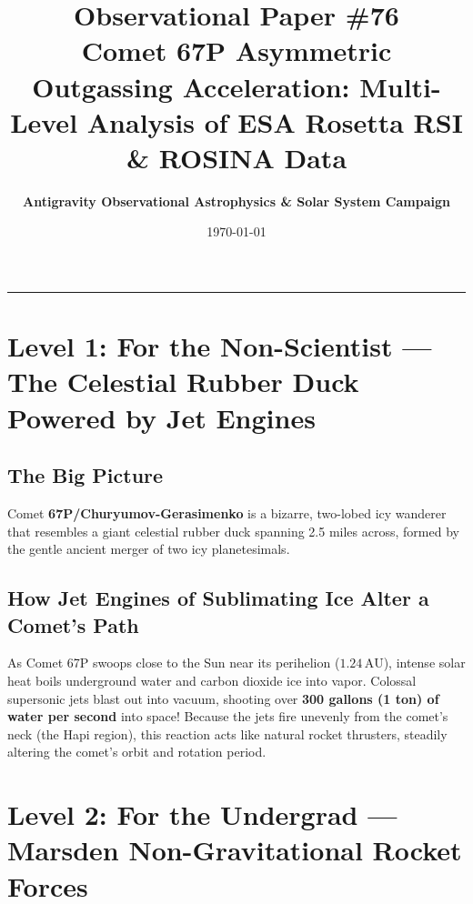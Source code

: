 \documentclass[11pt,a4paper]{article}
\title{\Huge \textbf{Observational Paper \#76}\\ \Large Comet 67P Asymmetric Outgassing Acceleration: Multi-Level Analysis of ESA Rosetta RSI \& ROSINA Data}
\author{\textbf{Antigravity Observational Astrophysics \& Solar System Campaign}}
\date{\today}
\begin{document}
\maketitle

\vspace{-1em}
\begin{center}
\rule{\textwidth}{1.5pt}
\end{center}

\section*{Level 1: For the Non-Scientist — The Celestial Rubber Duck Powered by Jet Engines}

\subsection*{The Big Picture}
Comet \textbf{67P/Churyumov-Gerasimenko} is a bizarre, two-lobed icy wanderer that resembles a giant celestial rubber duck spanning 2.5 miles across, formed by the gentle ancient merger of two icy planetesimals.

\subsection*{How Jet Engines of Sublimating Ice Alter a Comet's Path}
As Comet 67P swoops close to the Sun near its perihelion ($1.24\,\text{AU}$), intense solar heat boils underground water and carbon dioxide ice into vapor. Colossal supersonic jets blast out into vacuum, shooting over \textbf{300 gallons (1 ton) of water per second} into space! Because the jets fire unevenly from the comet's neck (the Hapi region), this reaction acts like natural rocket thrusters, steadily altering the comet's orbit and rotation period.

\newpage

\section*{Level 2: For the Undergrad — Marsden Non-Gravitational Rocket Forces}
\end{document}
